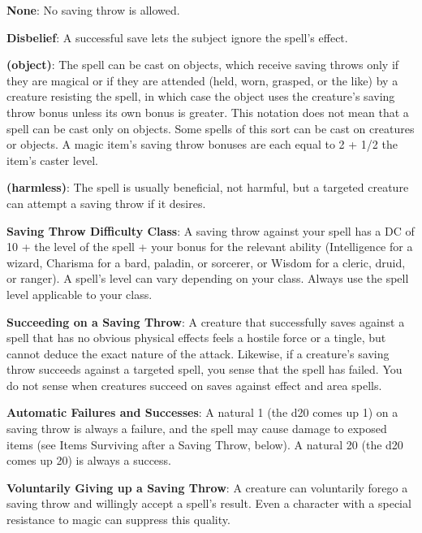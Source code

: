 \textbf{None}: No saving throw is allowed.
				
\textbf{Disbelief}: A successful save lets the subject ignore the spell's effect. 
				
\textbf{(object)}: The spell can be cast on objects, which receive saving throws only if they are magical or if they are attended (held, worn, grasped, or the like) by a creature resisting the spell, in which case the object uses the creature's saving throw bonus unless its own bonus is greater. This notation does not mean that a spell can be cast only on objects. Some spells of this sort can be cast on creatures or objects. A magic item's saving throw bonuses are each equal to 2 + 1/2 the item's caster level. 
				
\textbf{(harmless)}: The spell is usually beneficial, not harmful, but a targeted creature can attempt a saving throw if it desires.
				
\textbf{Saving Throw Difficulty Class}: A saving throw against your spell has a DC of 10 + the level of the spell + your bonus for the relevant ability (Intelligence for a wizard, Charisma for a bard, paladin, or sorcerer, or Wisdom for a cleric, druid, or ranger). A spell's level can vary depending on your class. Always use the spell level applicable to your class.
				
\textbf{Succeeding on a Saving Throw}: A creature that successfully saves against a spell that has no obvious physical effects feels a hostile force or a tingle, but cannot deduce the exact nature of the attack. Likewise, if a creature's saving throw succeeds against a targeted spell, you sense that the spell has failed. You do not sense when creatures succeed on saves against effect and area spells.
				
\textbf{Automatic Failures and Successes}: A natural 1 (the d20 comes up 1) on a saving throw is always a failure, and the spell may cause damage to exposed items (see Items Surviving after a Saving Throw, below). A natural 20 (the d20 comes up 20) is always a success.
				
\textbf{Voluntarily Giving up a Saving Throw}: A creature can voluntarily forego a saving throw and willingly accept a spell's result. Even a character with a special resistance to magic can suppress this quality.

